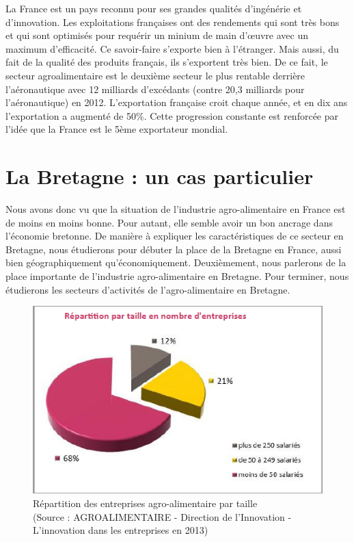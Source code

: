 \documentclass[a4paper,12pt]{report}
\begin{document}
			La France est un pays reconnu pour ses grandes qualités d’ingénérie et d’innovation. Les exploitations françaises ont des rendements qui sont très bons et qui sont optimisés pour requérir un minium de main d'œuvre avec un maximum d’efficacité. Ce savoir-faire s’exporte bien à l’étranger. Mais aussi, du fait de la qualité des produits français, ils s’exportent très bien. De ce fait, le secteur agroalimentaire est le deuxième secteur le plus rentable derrière l’aéronautique avec 12 milliards d’excédants (contre 20,3 milliards pour l’aéronautique) en 2012\cite{AAExport2014}. L’exportation française croit chaque année, et en dix ans l’exportation a augmenté de 50\%. Cette progression constante est renforcée par l’idée que la France est le 5ème exportateur mondial.

	\section{La Bretagne : un cas particulier}
	Nous avons donc vu que la situation de l’industrie agro-alimentaire en France est de moins en moins bonne. Pour autant, elle semble avoir un bon ancrage dans l’économie bretonne. De manière à expliquer les caractéristiques de ce secteur en Bretagne, nous étudierons pour débuter la place de la Bretagne en France, aussi bien géographiquement qu’économiquement. Deuxièmement, nous parlerons de la place importante de l’industrie agro-alimentaire en Bretagne. Pour terminer, nous étudierons les secteurs d’activités de l’agro-alimentaire en Bretagne.
	
	
	\begin{figure}[!h]
	\centering
	\includegraphics[scale=1]{Illustrations/RepartitionTaille.png}
	\caption{Répartition des entreprises agro-alimentaire par taille\\(Source : AGROALIMENTAIRE - Direction de l’Innovation - L’innovation dans les entreprises en 2013\cite{InnovationEntreprises2013})}
	\label{RepartitionParTaille}
	\end{figure}
	
\end{document}
